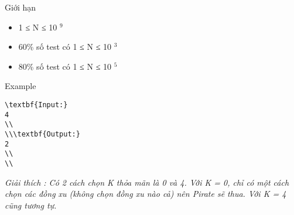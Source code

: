 Giới hạn
\begin{itemize}
	\item     1 ≤ N ≤ 10    $^     9    $
	\item     60\% số test có 1 ≤ N ≤ 10    $^     3    $
	\item     80\% số test có 1 ≤ N ≤ 10    $^     5    $
\end{itemize}
Example
\begin{verbatim}
\textbf{Input:}
4
\\
\\\textbf{Output:}
2
\\
\\\end{verbatim}

\emph{     Giải thích        : Có 2 cách chọn K thỏa mãn là 0 và 4. Với K = 0, chỉ có một cách chọn các đồng xu (không chọn đồng xu nào cả) nên Pirate sẽ thua. Với K = 4 cũng tương tự.    
\\}